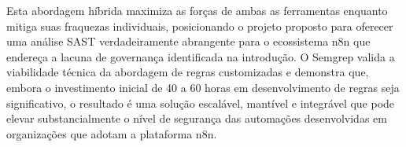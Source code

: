 \documentclass{sftex}
\begin{document}
Esta abordagem híbrida maximiza as forças de ambas as ferramentas enquanto mitiga suas fraquezas individuais, posicionando o projeto proposto para oferecer uma análise SAST verdadeiramente abrangente para o ecossistema n8n que endereça a lacuna de governança identificada na introdução. O Semgrep valida a viabilidade técnica da abordagem de regras customizadas e demonstra que, embora o investimento inicial de 40 a 60 horas em desenvolvimento de regras seja significativo, o resultado é uma solução escalável, mantível e integrável que pode elevar substancialmente o nível de segurança das automações desenvolvidas em organizações que adotam a plataforma n8n.

\newpage



\end{document}

